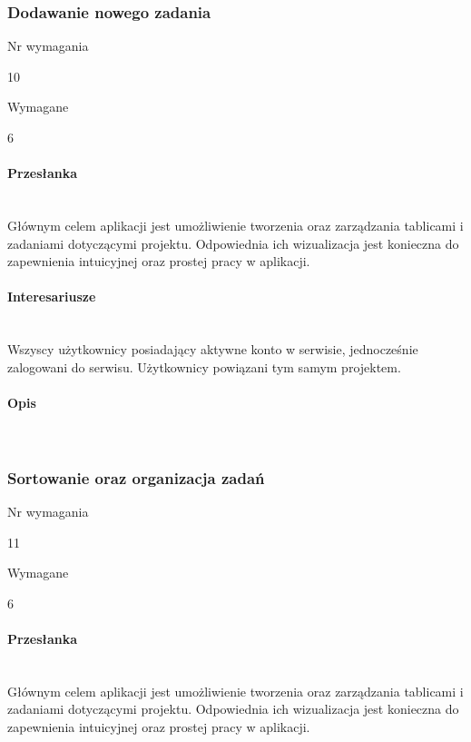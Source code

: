\documentclass[eng,printmode]{mgr}
\begin{document}
\subsubsection{Dodawanie nowego zadania}
\begin{labeling}{Nr wymagania}
\item [Nr wymagania:] 10
\item [Typ:] Wymagane
\item [Powiązania:] 6
\end{labeling}

\paragraph{Przesłanka}\ \\
Głównym celem aplikacji jest umożliwienie tworzenia oraz zarządzania tablicami i zadaniami dotyczącymi projektu. Odpowiednia ich wizualizacja jest konieczna do zapewnienia intuicyjnej oraz prostej pracy w aplikacji.

\paragraph{Interesariusze}\ \\
Wszyscy użytkownicy posiadający aktywne konto w serwisie, jednocześnie zalogowani do serwisu. Użytkownicy powiązani tym samym projektem.

\paragraph{Opis}\ \\
\newpage

\subsubsection{Sortowanie oraz organizacja zadań}
\begin{labeling}{Nr wymagania}
\item [Nr wymagania:] 11
\item [Typ:] Wymagane
\item [Powiązania:] 6
\end{labeling}

\paragraph{Przesłanka}\ \\
Głównym celem aplikacji jest umożliwienie tworzenia oraz zarządzania tablicami i zadaniami dotyczącymi projektu. Odpowiednia ich wizualizacja jest konieczna do zapewnienia intuicyjnej oraz prostej pracy w aplikacji.
\end{document}
